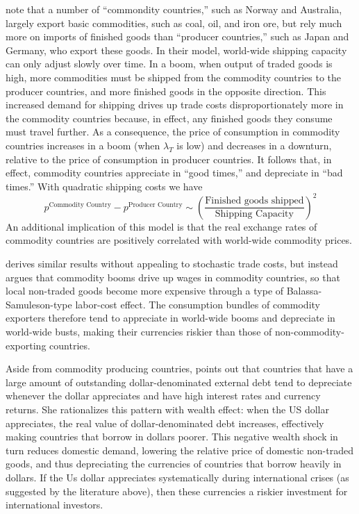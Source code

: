 \documentclass{ar-1col}
\begin{document}
\citet{Readyetal2013} note that a number of ``commondity countries,'' such as Norway and Australia, largely export basic commodities, such as coal, oil, and iron ore, but rely much more on imports of finished goods than ``producer countries,'' such as Japan and Germany, who export these goods. In their model, world-wide shipping capacity can only adjust slowly over time. In a boom, when output of traded goods is high, more commodities must be shipped from the commodity countries to the producer countries, and more finished goods in the opposite direction. This increased demand for shipping drives up trade costs disproportionately more in the commodity countries because, in effect, any finished goods they consume must travel further. As a consequence, the price of consumption in commodity countries increases in a boom (when $\lambda_T$ is low) and decreases in a downturn, relative to the price of consumption in producer countries. It follows that, in effect, commodity countries appreciate in ``good times,'' and depreciate in ``bad times.'' With quadratic shipping costs we have
\begin{equation*}
  p^{\text{Commodity Country}}-p^{\text{Producer Country}}\sim\left(\frac{\text{Finished goods shipped}}{\text{Shipping Capacity}}\right)^2
\end{equation*}
An additional implication of this model is that the real exchange rates of commodity countries are positively correlated with world-wide commodity prices. 

\citet{Powers2015} derives similar results without appealing to stochastic trade costs, but instead argues that commodity booms drive up wages in commodity countries, so that local non-traded goods become more expensive through a type of Balassa-Samuleson-type labor-cost effect. The consumption bundles of commodity exporters therefore tend to appreciate in world-wide booms and depreciate in world-wide busts, making their currencies riskier than those of non-commodity-exporting countries.

Aside from commodity producing countries, \citet{Wiriadinata2020} points out that countries that have a large amount of outstanding dollar-denominated external debt tend to depreciate whenever the dollar appreciates and have high interest rates and currency returns. She rationalizes this pattern with wealth effect: when the US dollar appreciates, the real value of dollar-denominated debt increases, effectively making countries that borrow in dollars poorer. This negative wealth shock in turn reduces domestic demand, lowering the relative price of domestic non-traded goods, and thus depreciating the currencies of countries that borrow heavily in dollars. If the Us dollar appreciates systematically during international crises (as suggested by the literature above), then these currencies a riskier investment for international investors.
\end{document}
